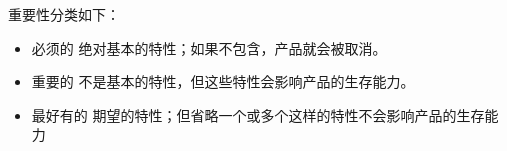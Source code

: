 
重要性分类如下：
\begin{itemize}
\item 必须的		绝对基本的特性；如果不包含，产品就会被取消。
\item 重要的		不是基本的特性，但这些特性会影响产品的生存能力。
\item 最好有的		期望的特性；但省略一个或多个这样的特性不会影响产品的生存能力
\end{itemize}
